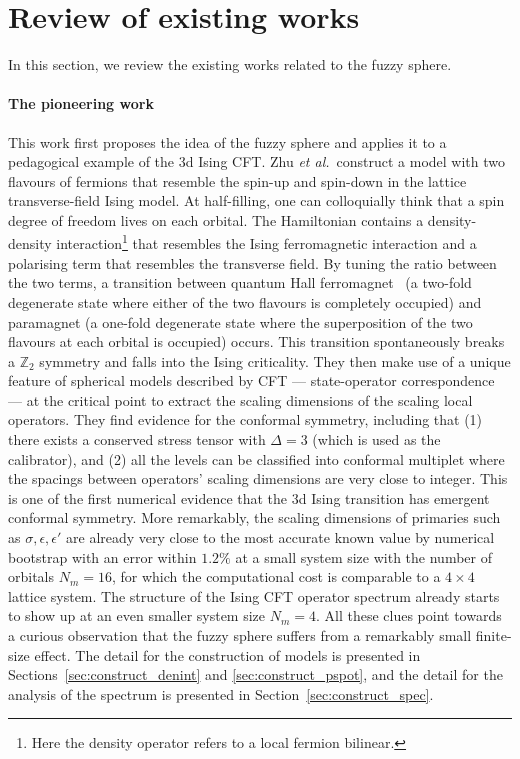 \documentclass{timesjhep}
\begin{document}
\section{Review of existing works}
\label{sec:review}

In this section, we review the existing works related to the fuzzy sphere.

\paragraph{The pioneering work~\cite{Zhu2022}}

This work first proposes the idea of the fuzzy sphere and applies it to a pedagogical example of the 3d Ising CFT. Zhu \textit{et al.}~construct a model with two flavours of fermions that resemble the spin-up and spin-down in the lattice transverse-field Ising model. At half-filling, one can colloquially think that a spin degree of freedom lives on each orbital. The Hamiltonian contains a density-density interaction\footnote{Here the density operator refers to a local fermion bilinear.} that resembles the Ising ferromagnetic interaction and a polarising term that resembles the transverse field. By tuning the ratio between the two terms, a transition between quantum Hall ferromagnet~\cite{Pasquier2000HallFM,Girvin2010HallFM} (a two-fold degenerate state where either of the two flavours is completely occupied) and paramagnet (a one-fold degenerate state where the superposition of the two flavours at each orbital is occupied) occurs. This transition spontaneously breaks a $\mathbb{Z}_2$ symmetry and falls into the Ising criticality. They then make use of a unique feature of spherical models described by CFT --- state-operator correspondence --- at the critical point to extract the scaling dimensions of the scaling local operators. They find evidence for the conformal symmetry, including that (1) there exists a conserved stress tensor with $\Delta=3$ (which is used as the calibrator), and (2) all the levels can be classified into conformal multiplet where the spacings between operators' scaling dimensions are very close to integer. This is one of the first numerical evidence that the 3d Ising transition has emergent conformal symmetry. More remarkably, the scaling dimensions of primaries such as $\sigma,\epsilon,\epsilon'$ are already very close to the most accurate known value by numerical bootstrap with an error within $1.2\%$ at a small system size with the number of orbitals $N_m=16$, for which the computational cost is comparable to a $4\times4$ lattice system. The structure of the Ising CFT operator spectrum already starts to show up at an even smaller system size $N_m=4$. All these clues point towards a curious observation that the fuzzy sphere suffers from a remarkably small finite-size effect. The detail for the construction of models is presented in Sections~\ref{sec:construct_denint} and \ref{sec:construct_pspot}, and the detail for the analysis of the spectrum is presented in Section~\ref{sec:construct_spec}.
\end{document}

